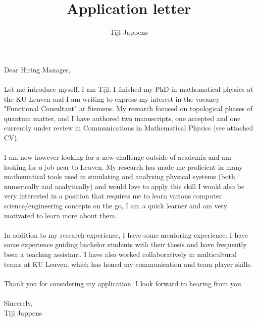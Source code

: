 \documentclass[11pt]{article}
\title{Application letter}
\author{Tijl Jappens}
\begin{document}
\maketitle
Dear Hiring Manager,\\\\
Let me introduce myself. I am Tijl, I finished my PhD in mathematical physics at the KU Leuven and I am writing to express my interest in the vacancy "Functional Consultant" at Siemens. My research focused on topological phases of quantum matter, and I have authored two manuscripts, one accepted and one currently under review in Communications in Mathematical Physics (see attached CV).\\\\
I am now however looking for a new challenge outside of academia and am looking for a job near to Leuven. My research has made me proficient in many mathematical tools used in simulating and analysing physical systems (both numerically and analytically) and would love to apply this skill I would also be very interested in a position that requires me to learn various computer science/engineering concepts on the go, I am a quick learner and am very motivated to learn more about them.\\\\
In addition to my research experience, I have some mentoring experience. I have some experience guiding bachelor students with their thesis and have frequently been a teaching assistant. I have also worked collaboratively in multicultural teams at KU Leuven, which has honed my communication and team player skills.
\\\\
Thank you for considering my application. I look forward to hearing from you.\\\\
Sincerely,\\
Tijl Jappens
\end{document}
